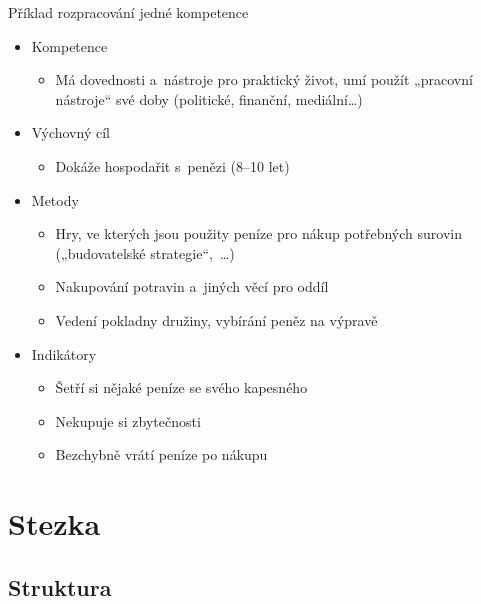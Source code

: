 \documentclass[compress, ucs, xelatex, xcolor=dvipsnames, print,
  hyperref={
    bookmarks=true,
    unicode=true,
    colorlinks=true,
    plainpages=false,
    pdfkeywords={Junak, Pedagogika, Skaut, Skauting, Vychovna metoda},
    linkcolor=Black,
    anchorcolor=Black,
    citecolor=OliveGreen,
    filecolor=OliveGreen,
    menucolor=Black,
    urlcolor=OliveGreen,
    pdftex}
  ]{beamer}
\begin{document}
\begin{frame}{Příklad rozpracování jedné kompetence}
  \begin{itemize}
    \item Kompetence
    \begin{itemize}
      \item Má dovednosti a~nástroje pro praktický život, umí použít „pracovní nástroje“ své doby (politické, finanční, mediální\ldots)
    \end{itemize}
    \item Výchovný cíl
    \begin{itemize}
      \item Dokáže hospodařit s~penězi (8--10 let)
    \end{itemize}
    \item Metody
    \begin{itemize}
      \item Hry, ve kterých jsou použity peníze pro nákup potřebných surovin („budovatelské strategie“,~\ldots)
      \item Nakupování potravin a~jiných věcí pro oddíl
      \item Vedení pokladny družiny, vybírání peněz na výpravě
    \end{itemize}
    \item Indikátory
    \begin{itemize}
      \item Šetří si nějaké peníze se svého kapesného
      \item Nekupuje si zbytečnosti
      \item Bezchybně vrátí peníze po nákupu
    \end{itemize}
  \end{itemize}
\end{frame}

\section{Stezka}

\subsection{Struktura}
\end{document}
